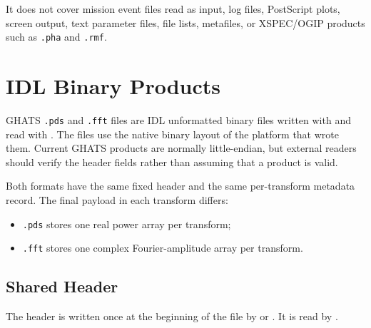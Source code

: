 It does not cover mission event files read as input, log files, PostScript
plots, screen output, text parameter files, file lists, metafiles, or
XSPEC/OGIP products such as \texttt{.pha} and \texttt{.rmf}.

\section{IDL Binary Products}

GHATS \texttt{.pds} and \texttt{.fft} files are IDL unformatted binary files
written with  and read with .  The files use the
native binary layout of the platform that wrote them.  Current GHATS products
are normally little-endian, but external readers should verify the header
fields rather than assuming that a product is valid.

Both formats have the same fixed header and the same per-transform metadata
record.  The final payload in each transform differs:

\begin{itemize}
\item \texttt{.pds} stores one real power array per transform;
\item \texttt{.fft} stores one complex Fourier-amplitude array per transform.
\end{itemize}

\subsection{Shared Header}

The header is written once at the beginning of the file by
 or .  It is read by
.

